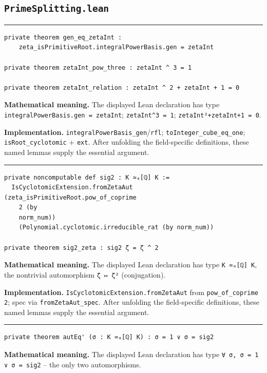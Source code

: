 \documentclass[UTF8,a4paper,11pt,fontset=fandol]{ctexart}
\theoremstyle{definition}
\newcommand{\statementsep}{\par\medskip\hrule\medskip}
\begin{document}
\subsection{\texttt{PrimeSplitting.lean}}

\statementsep
\begin{verbatim}
private theorem gen_eq_zetaInt :
    zeta_isPrimitiveRoot.integralPowerBasis.gen = zetaInt

private theorem zetaInt_pow_three : zetaInt ^ 3 = 1

private theorem zetaInt_relation : zetaInt ^ 2 + zetaInt + 1 = 0
\end{verbatim}
\noindent\textbf{Mathematical meaning.} The displayed Lean declaration has type \texttt{integralPowerBasis.\allowbreak{}gen = zetaInt}; \texttt{zetaInt\textasciicircum{}3 = 1}; \texttt{zetaInt²+zetaInt+1 = 0}.\par
\noindent\textbf{Implementation.} \texttt{integralPowerBasis\_\allowbreak{}gen}/\texttt{rfl}; \texttt{toInteger\_\allowbreak{}cube\_\allowbreak{}eq\_\allowbreak{}one}; \texttt{isRoot\_\allowbreak{}cyclotomic} + \texttt{ext}. After unfolding the field-specific definitions, these named lemmas supply the essential argument.\par
\statementsep
\begin{verbatim}
private noncomputable def sig2 : K ≃ₐ[ℚ] K :=
  IsCyclotomicExtension.fromZetaAut (zeta_isPrimitiveRoot.pow_of_coprime
    2 (by
    norm_num))
    (Polynomial.cyclotomic.irreducible_rat (by norm_num))

private theorem sig2_zeta : sig2 ζ = ζ ^ 2
\end{verbatim}
\noindent\textbf{Mathematical meaning.} The displayed Lean declaration has type \texttt{K ≃ₐ[ℚ] K}, the nontrivial automorphism \texttt{ζ ↦ ζ²} (conjugation).\par
\noindent\textbf{Implementation.} \texttt{IsCyclotomicExtension.\allowbreak{}fromZetaAut} from \texttt{pow\_\allowbreak{}of\_\allowbreak{}coprime 2}; spec via \texttt{fromZetaAut\_\allowbreak{}spec}. After unfolding the field-specific definitions, these named lemmas supply the essential argument.\par
\statementsep
\begin{verbatim}
private theorem autEq' (σ : K ≃ₐ[ℚ] K) : σ = 1 ∨ σ = sig2
\end{verbatim}
\noindent\textbf{Mathematical meaning.} The displayed Lean declaration has type \texttt{∀ σ, σ = 1 ∨ σ = sig2} -- the only two automorphisms.\par
\end{document}
